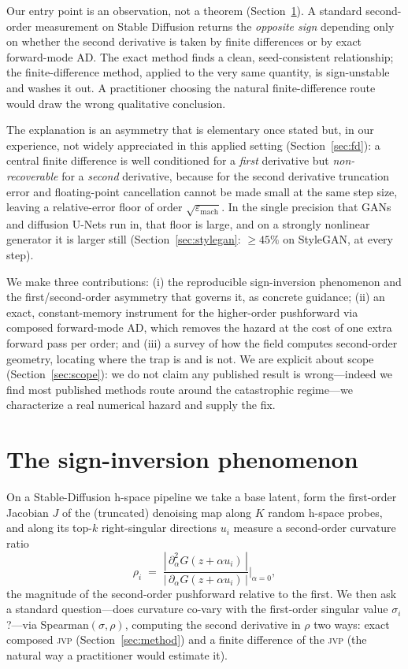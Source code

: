 \documentclass[11pt]{article}
\newcommand{\jvp}{\textsc{jvp}}
\newcommand{\eps}{\varepsilon}
\begin{document}
Our entry point is an observation, not a theorem (Section~\ref{sec:flip}). A
standard second-order measurement on Stable Diffusion returns the
\emph{opposite sign} depending only on whether the second derivative is taken by
finite differences or by exact forward-mode AD. The exact method finds a clean,
seed-consistent relationship; the finite-difference method, applied to the very
same quantity, is sign-unstable and washes it out. A practitioner choosing the
natural finite-difference route would draw the wrong qualitative conclusion.

The explanation is an asymmetry that is elementary once stated but, in our
experience, not widely appreciated in this applied setting
(Section~\ref{sec:fd}): a central finite difference is well conditioned for a
\emph{first} derivative but \emph{non-recoverable} for a \emph{second}
derivative, because for the second derivative truncation error and floating-point
cancellation cannot be made small at the same step size, leaving a relative-error
floor of order $\sqrt{\eps_{\mathrm{mach}}}$. In the single precision that GANs
and diffusion U-Nets run in, that floor is large, and on a strongly nonlinear
generator it is larger still (Section~\ref{sec:stylegan}: $\geq\!45\%$ on
StyleGAN, at every step).

We make three contributions: (i) the reproducible sign-inversion phenomenon and
the first/second-order asymmetry that governs it, as concrete guidance; (ii) an
exact, constant-memory instrument for the higher-order pushforward via composed
forward-mode AD, which removes the hazard at the cost of one extra forward pass
per order; and (iii) a survey of how the field computes second-order geometry,
locating where the trap is and is not. We are explicit about scope
(Section~\ref{sec:scope}): we do not claim any published result is wrong---indeed
we find most published methods route around the catastrophic regime---we
characterize a real numerical hazard and supply the fix.

\section{The sign-inversion phenomenon}
\label{sec:flip}
On a Stable-Diffusion h-space pipeline we take a base latent, form the first-order
Jacobian $J$ of the (truncated) denoising map along $K$ random h-space probes,
and along its top-$k$ right-singular directions $u_i$ measure a second-order
curvature ratio
\[
\rho_i \;=\; \frac{|\,\partial^2_\alpha G(z+\alpha u_i)\,|}{|\,\partial_\alpha
G(z+\alpha u_i)\,|}\Bigg|_{\alpha=0},
\]
the magnitude of the second-order pushforward relative to the first. We then ask a
standard question---does curvature co-vary with the first-order singular value
$\sigma_i$?---via Spearman$(\sigma,\rho)$, computing the second derivative in
$\rho$ two ways: exact composed \jvp{} (Section~\ref{sec:method}) and a finite
difference of the \jvp{} (the natural way a practitioner would estimate it).
\end{document}
